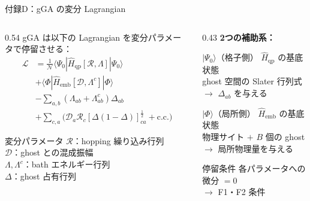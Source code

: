 \documentclass[12pt,aspectratio=169]{beamer}
\begin{document}
\begin{frame}[shrink=18]{付録D：gGA の変分 Lagrangian}
  \begin{columns}[T]
    \begin{column}{0.54\textwidth}
      \small gGA は以下の Lagrangian を変分パラメータで停留させる：
      {\small
      \begin{align*}
        \mathcal{L} &=
          \frac{1}{\mathcal{N}}\langle\Psi_0|\hat{H}_\mathrm{qp}[\mathcal{R},\Lambda]|\Psi_0\rangle\\
          &+\langle\Phi|\hat{H}_\mathrm{emb}[\mathcal{D},\Lambda^c]|\Phi\rangle\\
          &-\sum_{a,b}(\Lambda_{ab}+\Lambda^c_{ab})\Delta_{ab}\\
          &+\sum_{c,a}\bigl(\mathcal{D}_a\mathcal{R}_c[\Delta(1-\Delta)]^{\frac{1}{2}}_{ca}+\mathrm{c.c.}\bigr)
      \end{align*}
      }

      \begin{block}{\small 変分パラメータ}
        \footnotesize
        $\mathcal{R}$：hopping 繰り込み行列\\
        $\mathcal{D}$：ghost との混成振幅\\
        $\Lambda, \Lambda^c$：bath エネルギー行列\\
        $\Delta$：ghost 占有行列
      \end{block}
    \end{column}

    \begin{column}{0.43\textwidth}
      \textbf{2つの補助系：}

      \smallskip
      \begin{block}{\small $|\Psi_0\rangle$（格子側）}
        \footnotesize
        $\hat{H}_\mathrm{qp}$ の基底状態\\
        ghost 空間の Slater 行列式\\
        $\to$ $\Delta_{ab}$ を与える
      \end{block}

      \smallskip
      \begin{block}{\small $|\Phi\rangle$（局所側）}
        \footnotesize
        $\hat{H}_\mathrm{emb}$ の基底状態\\
        物理サイト $+$ $B$ 個の ghost\\
        $\to$ 局所物理量を与える
      \end{block}

      \smallskip
      \begin{alertblock}{\small 停留条件}
        \footnotesize
        各パラメータへの微分 $= 0$\\
        $\to$ F1・F2 条件
      \end{alertblock}
    \end{column}
  \end{columns}
\end{frame}
\end{document}
